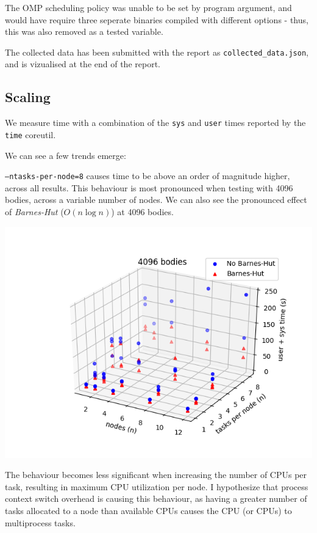 \documentclass[11pt,a4paper]{article}
\begin{document}
The OMP scheduling policy was unable to be set by program argument, and would have require three seperate binaries compiled with different options - thus, this was also removed as a tested variable.

The collected data has been submitted with the report as \texttt{collected\_data.json}, and is vizualised at the end of the report.

\subsection*{Scaling}

We measure time with a combination of the \texttt{sys} and \texttt{user} times reported by the \texttt{time} coreutil. 

We can see a few trends emerge:

\texttt{--ntasks-per-node=8} causes time to be above an order of magnitude higher, across all results. This behaviour is most pronounced when testing with 4096 bodies, across a variable number of nodes. We can also see the pronounced effect of \textit{Barnes-Hut} ($O(n \log n)$) at 4096 bodies.


\includegraphics[width=14.2cm]{4096-nodes-tasksPerNode}

The behaviour becomes less significant when increasing the number of CPUs per task, resulting in maximum CPU utilization per node. I hypothesize that process context switch overhead is causing this behaviour, as having a greater number of tasks allocated to a node than available CPUs causes the CPU (or CPUs) to multiprocess tasks. 
\end{document}
